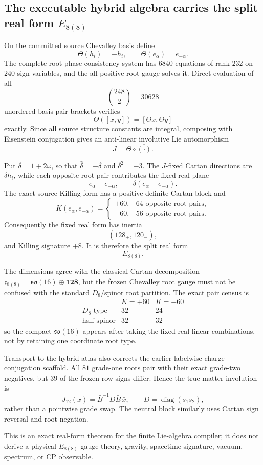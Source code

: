 \subsection*{The executable hybrid algebra carries the split real form $E_{8(8)}$}

On the committed source Chevalley basis define
\[
 \Theta(h_i)=-h_i,\qquad \Theta(e_\alpha)=e_{-\alpha}.
\]
The complete root-phase consistency system has $6840$ equations of rank $232$
on $240$ sign variables, and the all-positive root gauge solves it.  Direct
evaluation of all
\[
 \binom{248}{2}=30628
\]
unordered basis-pair brackets verifies
\[
 \Theta([x,y])=[\Theta x,\Theta y]
\]
exactly.  Since all source structure constants are integral, composing with
Eisenstein conjugation gives an anti-linear involutive Lie automorphism
\[
 J=\Theta\circ\overline{(\cdot)}.
\]

Put $\delta=1+2\omega$, so that $\bar\delta=-\delta$ and $\delta^2=-3$.
The $J$-fixed Cartan directions are $\delta h_i$, while each opposite-root
pair contributes the fixed real plane
\[
 e_\alpha+e_{-\alpha},\qquad
 \delta(e_\alpha-e_{-\alpha}).
\]
The exact source Killing form has a positive-definite Cartan block and
\[
 K(e_\alpha,e_{-\alpha})=
 \begin{cases}
 +60,&64\text{ opposite-root pairs},\\
 -60,&56\text{ opposite-root pairs}.
 \end{cases}
\]
Consequently the fixed real form has inertia
\[
 \boxed{(128_+,120_-)},
\]
and Killing signature $+8$.  It is therefore the split real form
\[
 \boxed{E_{8(8)}}.
\]

The dimensions agree with the classical Cartan decomposition
$\mathfrak e_{8(8)}=\mathfrak{so}(16)\oplus\mathbf{128}$, but the frozen
Chevalley root gauge must not be confused with the standard $D_8$/spinor root
partition.  The exact pair census is
\[
\begin{array}{c|cc}
 &K=+60&K=-60\\\hline
D_8\text{-type}&32&24\\
\text{half-spinor}&32&32
\end{array}
\]
so the compact $\mathfrak{so}(16)$ appears after taking the fixed real linear
combinations, not by retaining one coordinate root type.

Transport to the hybrid atlas also corrects the earlier labelwise
charge-conjugation scaffold.  All $81$ grade-one roots pair with their exact
grade-two negatives, but $39$ of the frozen row signs differ.  Hence the true
matter involution is
\[
 J_{12}(x)=\bar B^{-1}D\bar B\,\bar x,
 \qquad D=\operatorname{diag}(s_1s_2),
\]
rather than a pointwise grade swap.  The neutral block similarly uses Cartan
sign reversal and root negation.

This is an exact real-form theorem for the finite Lie-algebra compiler; it
does not derive a physical $E_{8(8)}$ gauge theory, gravity, spacetime
signature, vacuum, spectrum, or CP observable.
